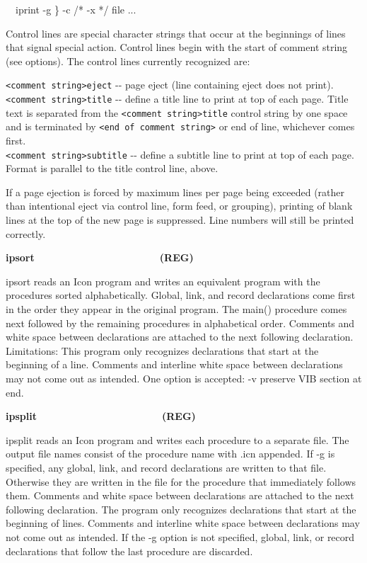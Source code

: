 {\sffamily
\ \ iprint -g {\textquotesingle} \}{\textquotesingle} -c
{\textquotesingle}/*{\textquotesingle} -x
{\textquotesingle}*/{\textquotesingle} file ... }

Control lines are special character strings that occur at the beginnings
of lines that signal special action. Control lines begin with the start
of comment string (see options). The control lines currently recognized
are:

\texttt{{\textless}comment string{\textgreater}eject} -{}- page eject
(line containing {\textquotedbl}eject{\textquotedbl} does not
print).\\
\texttt{{\textless}comment string{\textgreater}title} -{}- define a
title line to print at top of each page. Title text is separated from
the \texttt{{\textless}comment string{\textgreater}title} control
string by one space and is terminated by \texttt{{\textless}end of
comment string{\textgreater}} or end of line, whichever comes
first.\\
\texttt{{\textless}comment string{\textgreater}subtitle} -{}- define a
subtitle line to print at top of each page. Format is parallel to the
{\textquotedbl}title{\textquotedbl} control line, above.

If a page ejection is forced by maximum lines per page being exceeded
(rather than intentional eject via control line, form feed, or
grouping), printing of blank lines at the top of the new page is
suppressed. Line numbers will still be printed correctly. 

{\sffamily\bfseries
ipsort\ \ \ \ \ \ \ \ \ \ \ \ \ \ \ \ \ \ \ \ \ \ (REG)}

\textsf{ipsort} reads an Icon program and writes an equivalent program
with the procedures sorted
alphabetically. Global, link, and record declarations come first in the
order they appear in the original program. The main() procedure comes
next followed by the remaining procedures in alphabetical order.
Comments and white space between declarations are attached to the next
following declaration. Limitations: This program only recognizes
declarations that start at the beginning of a line. Comments and
interline white space between declarations may not come out as
intended. One option is accepted: -v preserve VIB section at end.

{\sffamily\bfseries
ipsplit\ \ \ \ \ \ \ \ \ \ \ \ \ \ \ \ \ \ \ \ \ \ (REG)}

\textsf{ipsplit} reads an Icon program and writes each procedure to a
separate file. The output file names consist of the procedure name with
\textsf{.icn} appended. If \textsf{{}-g} is specified, any global,
link, and record declarations are written to that file. Otherwise they
are written in the file for the procedure that immediately follows
them. Comments and white space between declarations are attached to the
next following declaration. The program only recognizes declarations
that start at the beginning of lines. Comments and interline white
space between declarations may not come out as intended. If the -g
option is not specified, global, link, or record declarations that
follow the last procedure are discarded.

